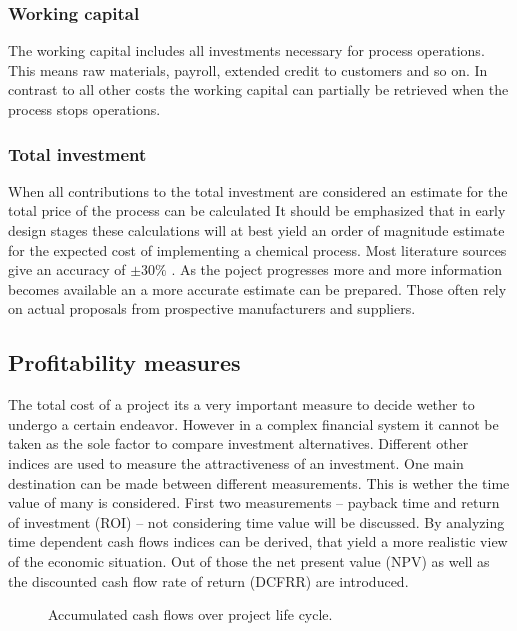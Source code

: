 \subsubsection{Working capital}
The working capital includes all investments necessary for process operations. This means raw
materials, payroll, extended credit to customers and so on. In contrast to all other costs the 
working capital can partially be retrieved when the process stops operations.     

\subsubsection{Total investment}
When all contributions to the total investment are considered an estimate for the total price of the 
process can be calculated
%
It should be emphasized that in early design stages these calculations will at best yield an order of
magnitude estimate for the expected cost of implementing a chemical process. Most literature sources 
give an accuracy of $\pm 30 \%$  \cite{Peters.2003}. As the poject progresses more and more information 
becomes available an a more accurate estimate can be prepared. Those often rely on actual proposals
from prospective manufacturers and suppliers. 

\subsection{Profitability measures}
The total cost of a project its a very important measure to decide wether to undergo a certain endeavor. 
However in a complex financial system it cannot be taken as the sole factor to compare investment 
alternatives. Different other indices are used to measure the attractiveness of an investment. One 
main destination can be made between different measurements. This is wether the time value of many
is considered. First two measurements -- payback time and return of investment (ROI) -- not considering time 
value will be discussed. By analyzing time dependent cash flows indices can be derived, that yield a more 
realistic view of the economic situation. Out of those the net present value (NPV) as well as the 
discounted cash flow rate of return (DCFRR) are introduced. 

\begin{figure}
	\centering
	
	\caption{Accumulated cash flows over project life cycle.}
\end{figure}

